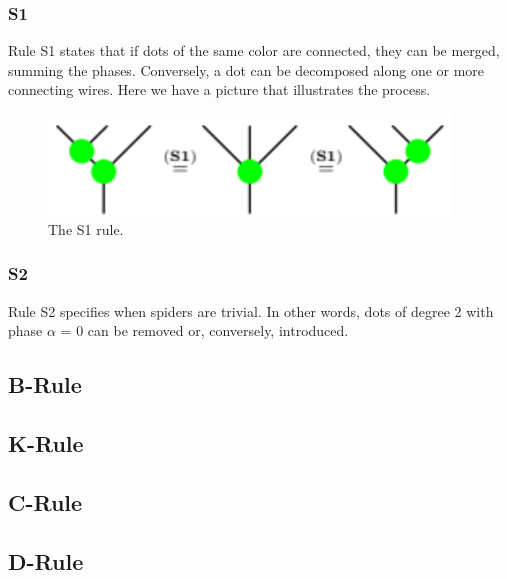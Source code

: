 \subsubsection{S1}
Rule S1 states that if dots of the same color are connected, they can be merged, summing the phases. Conversely, a dot can be decomposed along one or more connecting wires. Here we have a picture that illustrates the process.

\begin{figure}[H]
        \centering
        \includegraphics[width = 0.95\textwidth]{Figures/Screenshot (33).png}
        \caption{The S1 rule.}
        \label{fig:s1-rule}
    \end{figure}

\subsubsection{S2}
Rule S2 specifies when spiders are trivial. In other words, dots of degree 2 with phase $\alpha$ = 0 can be removed or, conversely, introduced.  

\subsection{B-Rule}

\subsection{K-Rule}

\subsection{C-Rule}

\subsection{D-Rule}
